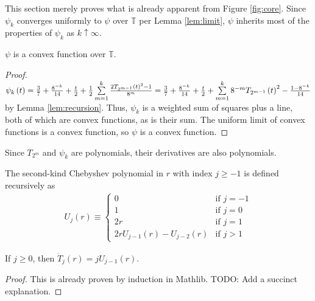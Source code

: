 This section merely proves what is already apparent from Figure \ref{fig:core}. Since $\psi_k$ converges uniformly to $\psi$ over $\mathbb{T}$ per Lemma \ref{lem:limit}, $\psi$ inherits most of the properties of $\psi_k$ as $k \uparrow \infty$.
\begin{lemma}
  \label{lem:convexity}
  \leanok
  $\psi$ is a convex function over $\mathbb{T}$.
\end{lemma}
  
\begin{proof}
  \leanok
  $\psi_k\left(t\right) = \frac{3}{7} + \frac{8^{-k}}{14} + \frac{t}{2} + \frac{1}{2} \sum\limits_{m = 1}^k  \frac{2 T_{2^{m - 1}}\left(t\right)^2 - 1}{8^m} = \frac{3}{7} + \frac{8^{-k}}{14} + \frac{t}{2} + \sum\limits_{m = 1}^k  8^{-m} T_{2^{m - 1}}\left(t\right)^2 - \frac{1 - 8^{-k}}{14}$ by Lemma \ref{lem:recursion}. Thus, $\psi_k$ is a weighted sum of squares plus a line, both of which are convex functions, as is their sum. The uniform limit of convex functions is a convex function, so $\psi$ is a convex function.
\end{proof}

Since $T_{2^m}$ and $\psi_k$ are polynomials, their derivatives are also polynomials.
\begin{definition}
  \label{def:U}
  \leanok
  The second-kind Chebyshev polynomial in $r$ with index $j \geq -1$ is defined recursively as
  \begin{align*}
U_j\left(r\right) \equiv 
\begin{cases}
0 & \text{if } j = -1 \\
1 & \text{if } j = 0 \\
2r & \text{if } j = 1 \\
2 r U_{j - 1}\left(r\right) - U_{j - 2}\left(r\right) & \text{if } j > 1
\end{cases}
  \end{align*}
\end{definition}

\begin{lemma}[]
  \label{lem:T_derivative}
  \leanok
  If $j \geq 0$, then $\dot{T}_j\left(r\right) = j U_{j - 1}\left(r\right)$.
\end{lemma}
  
\begin{proof}
  \leanok
  This is already proven by induction in Mathlib. TODO: Add a succinct explanation.
\end{proof}

